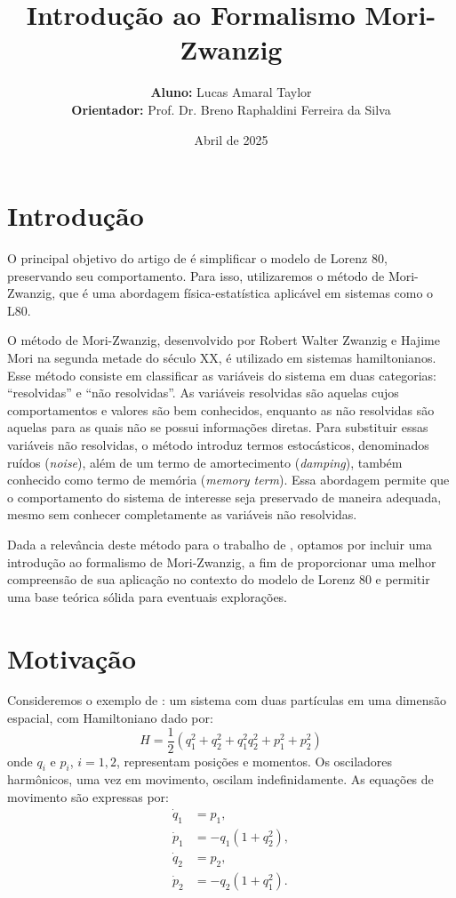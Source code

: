 \documentclass[12pt]{article}
\title{Introdução ao Formalismo Mori-Zwanzig}
\date{Abril de 2025}
\author{
    \textbf{Aluno:} Lucas Amaral Taylor\\
    \textbf{Orientador:} Prof. Dr. Breno Raphaldini Ferreira da Silva
}
\begin{document}
\maketitle

\section{Introdução}
O principal objetivo do artigo de \citet{Chekroun2021} é simplificar o modelo de Lorenz 80, preservando seu comportamento. Para isso, utilizaremos o método de Mori-Zwanzig, que é uma abordagem física-estatística aplicável em sistemas como o L80.

O método de Mori-Zwanzig, desenvolvido por Robert Walter Zwanzig e Hajime Mori na segunda metade do século XX, é utilizado em sistemas hamiltonianos. Esse método consiste em classificar as variáveis do sistema em duas categorias: ``resolvidas'' e ``não resolvidas''. As variáveis resolvidas são aquelas cujos comportamentos e valores são bem conhecidos, enquanto as não resolvidas são aquelas para as quais não se possui informações diretas. Para substituir essas variáveis não resolvidas, o método introduz termos estocásticos, denominados ruídos (\textit{noise}), além de um termo de amortecimento (\textit{damping}), também conhecido como termo de memória (\textit{memory term}). Essa abordagem permite que o comportamento do sistema de interesse seja preservado de maneira adequada, mesmo sem conhecer completamente as variáveis não resolvidas.

Dada a relevância deste método para o trabalho de \citet{Chekroun2021}, optamos por incluir uma introdução ao formalismo de Mori-Zwanzig, a fim de proporcionar uma melhor compreensão de sua aplicação no contexto do modelo de Lorenz 80 e permitir uma base teórica sólida para eventuais explorações.
\newpage
\section{Motivação}
Consideremos o exemplo de \citet[p.173]{Chorin2013}: um sistema com duas partículas em uma dimensão espacial, com Hamiltoniano dado por:
\begin{equation*}
	H = \frac{1}{2}(q_1^2 + q_2^2 + q_1^2 q_2^2 + p_1^2 + p_2^2)
\end{equation*}
onde $q_i$ e $p_i$, $i = 1, 2$, representam posições e momentos. Os osciladores harmônicos, uma vez em movimento, oscilam indefinidamente. As equações de movimento são expressas por:
\begin{align}
	\dot{q}_1 & = p_1, \nonumber             \\
	\dot{p}_1 & = -q_1(1 + q_2^2), \nonumber \\
	\dot{q}_2 & = p_2, \nonumber             \\
	\dot{p}_2 & = -q_2(1 + q_1^2).           
	\label{eq:exemplo-sistema-harmonico}
\end{align}
\end{document}
